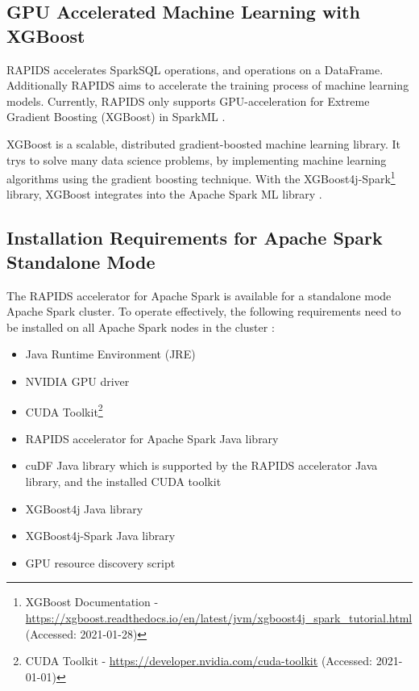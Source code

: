 \subsection{GPU Accelerated Machine Learning with XGBoost}
RAPIDS accelerates SparkSQL operations, and operations on a DataFrame. Additionally RAPIDS aims to accelerate the training process of machine learning models.
Currently, RAPIDS only supports GPU-acceleration for Extreme Gradient Boosting (XGBoost) in SparkML \cite{Mcdonald2020SparkRapids}.


XGBoost is a scalable, distributed gradient-boosted machine learning library. It trys to solve many data science problems, by implementing machine learning algorithms using the gradient boosting technique.
With the XGBoost4j-Spark\footnote{XGBoost Documentation - \url{https://xgboost.readthedocs.io/en/latest/jvm/xgboost4j_spark_tutorial.html} (Accessed: 2021-01-28)} library, XGBoost integrates into the Apache Spark ML library \cite{XGBoost2021Docs}. 


\subsection{Installation Requirements for Apache Spark Standalone Mode}
\label{subsec:04_rapids_req}
The RAPIDS accelerator for Apache Spark is available for a standalone mode Apache Spark cluster. To operate effectively, the following requirements need to be installed on all Apache Spark nodes in the cluster \cite{SparkRapids2020Docs}:
\begin{itemize}
\item Java Runtime Environment (JRE)
\item NVIDIA GPU driver
\item CUDA Toolkit\footnote{CUDA Toolkit - \url{https://developer.nvidia.com/cuda-toolkit} (Accessed: 2021-01-01)}
\item RAPIDS accelerator for Apache Spark Java library
\item cuDF Java library which is supported by the RAPIDS accelerator Java library, and the installed CUDA toolkit
\item XGBoost4j Java library
\item XGBoost4j-Spark Java library
\item GPU resource discovery script
\end{itemize}



